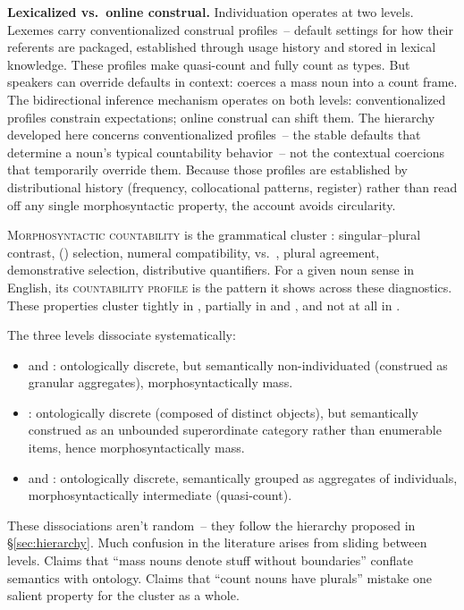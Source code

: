 \documentclass[12pt,a4paper]{article}
\begin{document}
\textbf{Lexicalized vs.\ online construal.} Individuation operates at two levels. Lexemes carry conventionalized construal profiles~-- default settings for how their referents are packaged, established through usage history and stored in lexical knowledge. These profiles make  quasi-count and  fully count as types. But speakers can override defaults in context:  coerces a mass noun into a count frame. The bidirectional inference mechanism operates on both levels: conventionalized profiles constrain expectations; online construal can shift them. The hierarchy developed here concerns conventionalized profiles~-- the stable defaults that determine a noun's typical countability behavior~-- not the contextual coercions that temporarily override them. Because those profiles are established by distributional history (frequency, collocational patterns, register) rather than read off any single morphosyntactic property, the account avoids circularity.

\textsc{Morphosyntactic countability} is the grammatical cluster \citep[pp.~333--336]{huddleston2002,allan1980}: singular--plural contrast, () selection, numeral compatibility,  vs.\ , plural agreement, demonstrative selection, distributive quantifiers. For a given noun sense in English, its \textsc{countability profile} is the pattern it shows across these diagnostics. These properties cluster tightly in , partially in  and , and not at all in .

The three levels dissociate systematically:

\begin{itemize}
\item {} and : ontologically discrete, but semantically non-individuated (construed as granular aggregates), morphosyntactically mass.
\item {}: ontologically discrete (composed of distinct objects), but semantically construed as an unbounded superordinate category rather than enumerable items, hence morphosyntactically mass.
\item {} and : ontologically discrete, semantically grouped as aggregates of individuals, morphosyntactically intermediate (quasi-count).
\end{itemize}

These dissociations aren't random~-- they follow the hierarchy proposed in \S\ref{sec:hierarchy}. Much confusion in the literature arises from sliding between levels. Claims that \enquote{mass nouns denote stuff without boundaries} conflate semantics with ontology. Claims that \enquote{count nouns have plurals} mistake one salient property for the cluster as a whole.
\end{document}
